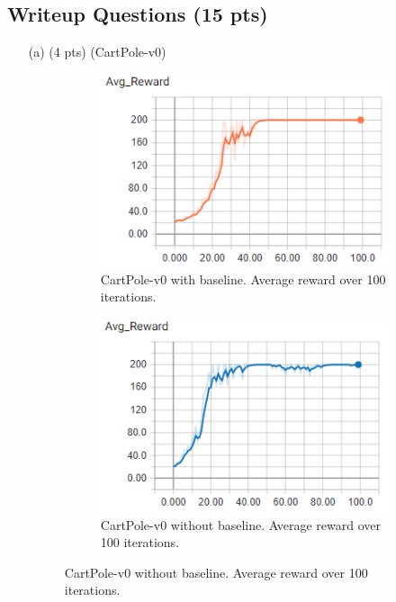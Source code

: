 \documentclass{article}
\begin{document}
\subsection{Writeup Questions (15 pts)}
\begin{enumerate}
\item[(a) (4 pts)] (CartPole-v0)
\begin{figure}[H]
	\centering
	\begin{subfigure}[b]{.4\textwidth}
		\centering
		\includegraphics[width=0.9\linewidth]{cartpole-baseline-avgreward.png}
		\caption{CartPole-v0 with baseline. Average reward over 100 iterations.}
	\end{subfigure}
	\qquad
	\begin{subfigure}[b]{.4\textwidth}
		\centering
		\includegraphics[width=0.9\linewidth]{cartpole-nobaseline-avgreward.png}
		\caption{CartPole-v0 without baseline. Average reward over 100 iterations.}
	\end{subfigure}
\end{figure}


\end{enumerate}
\end{document}
